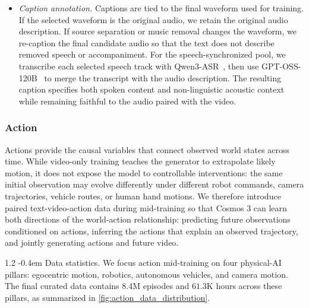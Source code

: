 \documentclass{llmxive}
\makeatletter
\providecommand{\paragraph}{  \@startsection{paragraph}{4}{\z@}    {1\baselineskip \@plus .2\baselineskip}    {-0.4em}    {\normalfont\normalsize\bfseries}}
\makeatother
\begin{document}
\begin{itemize}
    \item \textit{Caption annotation.} Captions are tied to the final waveform used for training. If the selected waveform is the original audio, we retain the original audio description. If source separation or music removal changes the waveform, we re-caption the final candidate audio so that the text does not describe removed speech or accompaniment. For the speech-synchronized pool, we transcribe each selected speech track with Qwen3-ASR~\citep{shi2026qwen3asr}, then use GPT-OSS-120B~\citep{agarwal2025gptoss} to merge the transcript with the audio description. The resulting caption specifies both spoken content and non-linguistic acoustic context while remaining faithful to the audio paired with the video.
\end{itemize}
\subsubsection{Action}
\label{subsubsec::data_gen_action}

Actions provide the causal variables that connect observed world states across time. While video-only training teaches the generator to extrapolate likely motion, it does not expose the model to controllable interventions: the same initial observation may evolve differently under different robot commands, camera trajectories, vehicle routes, or human hand motions. We therefore introduce paired text-video-action data during mid-training so that Cosmos 3 can learn both directions of the world-action relationship: predicting future observations conditioned on actions, inferring the actions that explain an observed trajectory, and jointly generating actions and future video.

\paragraph{Data statistics.} We focus action mid-training on four physical-AI pillars: egocentric motion, robotics, autonomous vehicles, and camera motion. The final curated data contains $8.4$M episodes and $61.3$K hours across these pillars, as summarized in \cref{fig:action_data_distribution}.
\end{document}
